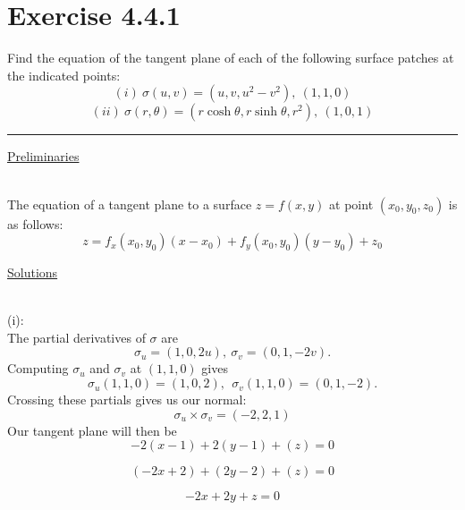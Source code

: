 \documentclass[12pt]{article}
\newcommand{\ulind}[1]
{
\noindent
\underline{#1}\\\\
\indent
}
\begin{document}
\maketitle

\section*{Exercise 4.4.1}
\indent

Find the equation of the tangent plane of each of the following surface patches at the indicated points:\\

$$
(i) \ \sigma(u,v) = (u,v,u^2-v^2), \ (1,1,0)
$$
$$
(ii) \ \sigma(r,\theta) = (r \cosh \theta, r \sinh \theta,r^2), \ (1,0,1)
$$

\vspace{1cm}
\hrule
\vspace{1cm}
\noindent

\ulind{Preliminaries}

The equation of a tangent plane to a surface $z = f(x,y)$ at point $(x_0,y_0,z_0)$ is as follows:
$$
z = f_x(x_0,y_0)(x-x_0)+f_y(x_0,y_0)(y-y_0)+z_0
$$

\ulind{Solutions}
(i):\\
The partial derivatives of $\sigma$ are
$$
\sigma_u = (1,0,2u), \ \sigma_v = (0,1,-2v). 
$$
Computing $\sigma_u$ and $\sigma_v$ at $(1,1,0)$ gives
$$
\sigma_u(1,1,0) = (1,0,2), \ \ \sigma_v(1,1,0) = (0,1,-2). 
$$
Crossing these partials gives us our normal:
$$
\sigma_u \times \sigma_v = (-2,2,1)
$$
Our tangent plane will then be
$$
-2(x-1)+2(y-1)+(z)=0
$$

$$
(-2x+2)+(2y-2)+(z)=0
$$

$$
-2x+2y+z=0
$$
\end{document}

